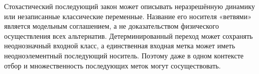 {Стохастический последующий закон может описывать неразрешённую динамику или незаписанные классические переменные. Название его носителя «ветвями» является модельным соглашением, а не доказательством физического осуществления всех альтернатив. Детерминированный переход может сохранять неоднозначный входной класс, а единственная входная метка может иметь неодноэлементный последующий носитель. Поэтому даже в одном контексте отбор и множественность последующих меток могут сосуществовать.}

